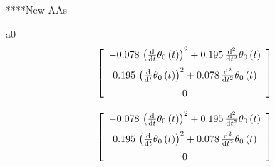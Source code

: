 ****New AAs

a0
\begin{equation}\label{newaabody0}
\left[ \begin {array}{c} - 0.078\, \left( {\frac {\rm d}{{\rm d}t}}
\theta_{{0}} \left( t \right)  \right) ^{2}+ 0.195\,{\frac {{\rm d}^{2
}}{{\rm d}{t}^{2}}}\theta_{{0}} \left( t \right) \\ \noalign{\medskip}
 0.195\, \left( {\frac {\rm d}{{\rm d}t}}\theta_{{0}} \left( t
 \right)  \right) ^{2}+ 0.078\,{\frac {{\rm d}^{2}}{{\rm d}{t}^{2}}}
\theta_{{0}} \left( t \right) \\ \noalign{\medskip}0\end {array}
 \right] 
\end{equation}

\begin{equation}\label{newaabodyAA1}
\left[ \begin {array}{c} - 0.078\, \left( {\frac {\rm d}{{\rm d}t}}
\theta_{{0}} \left( t \right)  \right) ^{2}+ 0.195\,{\frac {{\rm d}^{2
}}{{\rm d}{t}^{2}}}\theta_{{0}} \left( t \right) \\ \noalign{\medskip}
 0.195\, \left( {\frac {\rm d}{{\rm d}t}}\theta_{{0}} \left( t
 \right)  \right) ^{2}+ 0.078\,{\frac {{\rm d}^{2}}{{\rm d}{t}^{2}}}
\theta_{{0}} \left( t \right) \\ \noalign{\medskip}0\end {array}
 \right] 
\end{equation}

